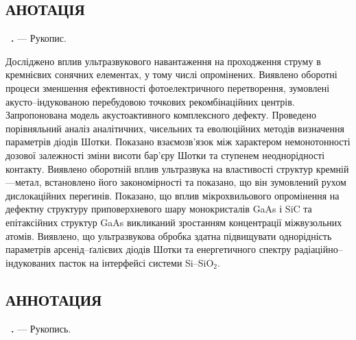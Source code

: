 \begin{center}
\section*{\MakeUppercase{анотація}}
\end{center}
\textbf{\thesisAuthorFIO~\thesisTitle.} --- Рукопис.

\abstractBegin

Досліджено вплив ультразвукового навантаження на проходження струму в кремнієвих сонячних елементах,
 у тому числі опромінених.
 Виявлено оборотні процеси зменшення ефективності фотоелектричного перетворення,
 зумовлені акусто--індукованою перебудовою точкових рекомбінаційних центрів.
 Запропонована модель акустоактивного комплексного дефекту.
 Проведено порівняльний аналіз аналітичних, чисельних та еволюційних методів визначення параметрів діодів Шотки.
 Показано взаємозв'язок між характером немонотонності дозової залежності зміни висоти бар'єру Шотки та ступенем неоднорідності контакту.
 Виявлено оборотній вплив ультразвука на властивості структур кремній---метал, встановлено його закономірності
 та показано, що він зумовлений рухом дислокаційних перегинів.
 Показано, що вплив мікрохвильового опромінення на дефектну структуру приповерхневого шару монокристалів GaAs і SiC та епітаксійних структур GaAs
 викликаний зростанням концентрації міжвузольних атомів.
 Виявлено, що ультразвукова обробка здатна підвищувати однорідність параметрів арсенід--ґалієвих діодів Шотки та енергетичного спектру радіаційно--індукованих пасток  на інтерфейсі системи  Si--SiO$_2$.

\keywords


\begin{center}
{\section*{\MakeUppercase{АННОТАЦИЯ}}}
\end{center}
\textbf{\thesisAuthorFIOru~\thesisTitleRu.} --- Рукопись.

\abstractBeginRu

